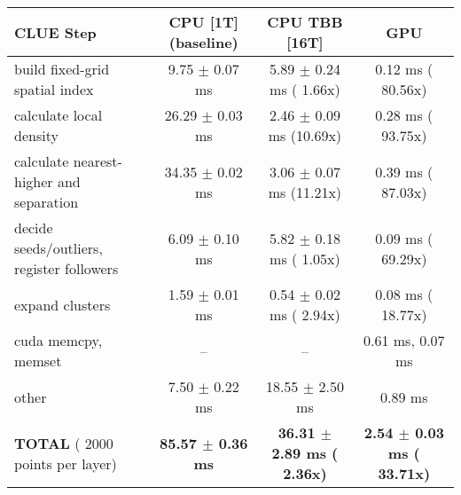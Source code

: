     \begin{tabular}{l|c|c|c}
    \hline
    CLUE Step                                 & CPU [1T] (baseline)         & CPU TBB [16T]                         & GPU                       \\ \hline
    build fixed-grid spatial index            &   9.75 $\pm$  0.07 ms       &   5.89 $\pm$  0.24 ms ( 1.66x)        &   0.12 ms ( 80.56x)       \\
    calculate local density                   &  26.29 $\pm$  0.03 ms       &   2.46 $\pm$  0.09 ms (10.69x)        &   0.28 ms ( 93.75x)       \\
    calculate nearest-higher and separation   &  34.35 $\pm$  0.02 ms       &   3.06 $\pm$  0.07 ms (11.21x)        &   0.39 ms ( 87.03x)       \\
    decide seeds/outliers, register followers &   6.09 $\pm$  0.10 ms       &   5.82 $\pm$  0.18 ms ( 1.05x)        &   0.09 ms ( 69.29x)       \\
    expand clusters                           &   1.59 $\pm$  0.01 ms       &   0.54 $\pm$  0.02 ms ( 2.94x)        &   0.08 ms ( 18.77x)       \\ \hline
    cuda memcpy, memset                       & --                          & --                                    &   0.61 ms,   0.07 ms      \\ 
    other                                     &   7.50 $\pm$  0.22 ms       &  18.55 $\pm$  2.50 ms                 &   0.89 ms                 \\ \hline
    \textbf{TOTAL} ( 2000 points per layer)   & \textbf{ 85.57 $\pm$  0.36 ms} & \textbf{ 36.31 $\pm$  2.89 ms ( 2.36x)} & \textbf{  2.54 $\pm$  0.03 ms ( 33.71x)}  \\
    \hline 
    \end{tabular}
    \linebreak


